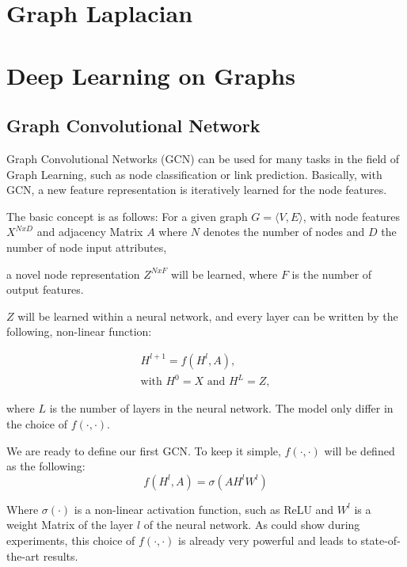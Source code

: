 \section{Graph Laplacian}

\section{Deep Learning on Graphs}

\subsection{Graph Convolutional Network}
Graph Convolutional Networks (GCN) \cite{GCN} can be used for many tasks in the field 
of Graph Learning, such as node classification or link prediction. 
Basically, with GCN, a new feature representation is iteratively learned for the node features.

The basic concept is as follows:
For a given graph $G = \langle V,E \rangle$, with node features $X^{N x D}$ and adjacency Matrix $A$
where $N$ denotes the number of nodes and $D$ the number of node input attributes,

a novel node representation $Z^{N x F}$ will be learned, where $F$ is the number of output features.

$Z$ will be learned within a neural network, and every layer can be written by the following, non-linear function:

\begin{equation}
    \begin{aligned}
        H^{l + 1} = f( H^l, A), \\
        \text{with } H^0 = X \text{ and } H^L = Z, 
    \end{aligned}
\end{equation}

where $L$ is the number of layers in the neural network.
The model only differ in the choice of $f(\cdot,\cdot)$.

We are ready to define our first GCN. To keep it simple, $f(\cdot,\cdot)$ will be defined as the following:
\begin{equation}
    f( H^l, A) = \sigma (A H^l W^l)
\end{equation} 

Where $\sigma ( \cdot )$ is a non-linear activation function, such as ReLU and $W^l$ is
a weight Matrix of the layer $l$ of the neural network. As \cite{GCN} could show during experiments,
this choice of $f(\cdot,\cdot)$ is already very powerful and leads to state-of-the-art results.

